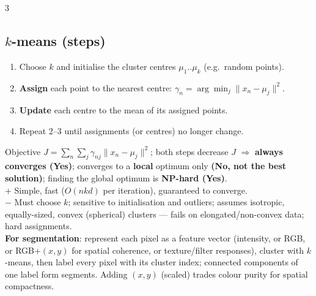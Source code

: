\documentclass[9pt,a4paper,landscape]{extarticle}
\newcommand{\key}[1]{\textbf{#1}}
\begin{document}
\begin{multicols}{3}
\subsection{$k$-means (steps)}
\begin{enumerate}
\item Choose $k$ and initialise the cluster centres $\mu_1..\mu_k$ (e.g.\ random points).
\item \key{Assign} each point to the nearest centre: $\gamma_n=\arg\min_j\|x_n-\mu_j\|^2$.
\item \key{Update} each centre to the mean of its assigned points.
\item Repeat 2--3 until assignments (or centres) no longer change.
\end{enumerate}
Objective $J=\sum_n\sum_j \gamma_{nj}\|x_n-\mu_j\|^2$; both steps decrease $J$ $\Rightarrow$ \key{always converges (Yes)}; converges to a \key{local} optimum only \key{(No, not the best solution)}; finding the global optimum is \key{NP-hard (Yes)}.\\
$+$ Simple, fast ($O(nkd)$ per iteration), guaranteed to converge.\\
$-$ Must choose $k$; sensitive to initialisation and outliers; assumes isotropic, equally-sized, convex (spherical) clusters --- fails on elongated/non-convex data; hard assignments.\\
\key{For segmentation}: represent each pixel as a feature vector (intensity, or RGB, or RGB$+$$(x,y)$ for spatial coherence, or texture/filter responses), cluster with $k$-means, then label every pixel with its cluster index; connected components of one label form segments. Adding $(x,y)$ (scaled) trades colour purity for spatial compactness.


\end{multicols}
\end{document}
